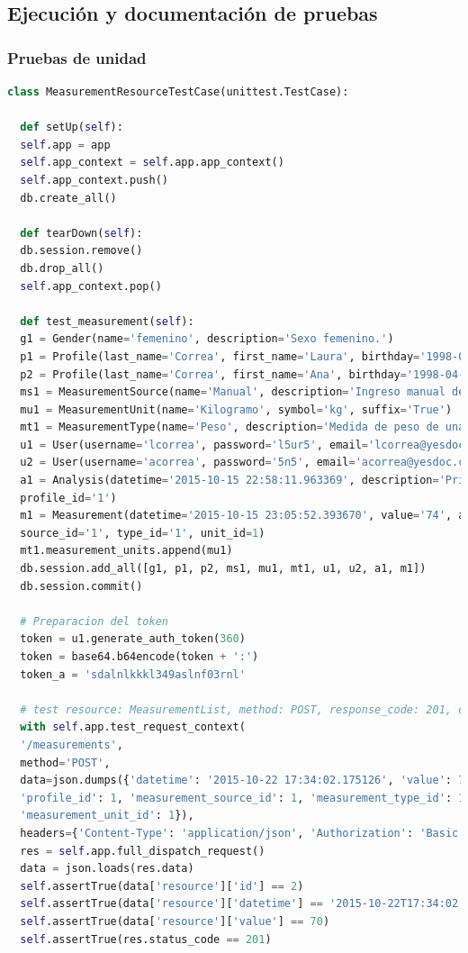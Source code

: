  \subsection{Ejecución y documentación de pruebas}
  
  \subsubsection{Pruebas de unidad}
  
  \begin{lstlisting}[language=Python ]
  class MeasurementResourceTestCase(unittest.TestCase):
  
  def setUp(self):
  self.app = app
  self.app_context = self.app.app_context()
  self.app_context.push()
  db.create_all()
  
  def tearDown(self):
  db.session.remove()
  db.drop_all()
  self.app_context.pop()
  
  def test_measurement(self):
  g1 = Gender(name='femenino', description='Sexo femenino.')
  p1 = Profile(last_name='Correa', first_name='Laura', birthday='1998-08-20', gender_id='1')
  p2 = Profile(last_name='Correa', first_name='Ana', birthday='1998-04-10', gender_id='1')
  ms1 = MeasurementSource(name='Manual', description='Ingreso manual de la medida.')
  mu1 = MeasurementUnit(name='Kilogramo', symbol='kg', suffix='True')
  mt1 = MeasurementType(name='Peso', description='Medida de peso de una persona')
  u1 = User(username='lcorrea', password='l5ur5', email='lcorrea@yesdoc.com', profile_id='1')
  u2 = User(username='acorrea', password='5n5', email='acorrea@yesdoc.com', profile_id='2')
  a1 = Analysis(datetime='2015-10-15 22:58:11.963369', description='Primer toma de medidas de peso',
  profile_id='1')
  m1 = Measurement(datetime='2015-10-15 23:05:52.393670', value='74', analysis_id='1', profile_id='1',
  source_id='1', type_id='1', unit_id=1)
  mt1.measurement_units.append(mu1)
  db.session.add_all([g1, p1, p2, ms1, mu1, mt1, u1, u2, a1, m1])
  db.session.commit()
  
  # Preparacion del token
  token = u1.generate_auth_token(360)
  token = base64.b64encode(token + ':')
  token_a = 'sdalnlkkkl349aslnf03rnl'
  
  # test resource: MeasurementList, method: POST, response_code: 201, con autorizacion
  with self.app.test_request_context(
  '/measurements',
  method='POST',
  data=json.dumps({'datetime': '2015-10-22 17:34:02.175126', 'value': 70, 'analysis_id': 1,
  'profile_id': 1, 'measurement_source_id': 1, 'measurement_type_id': 1,
  'measurement_unit_id': 1}),
  headers={'Content-Type': 'application/json', 'Authorization': 'Basic ' + token}):
  res = self.app.full_dispatch_request()
  data = json.loads(res.data)
  self.assertTrue(data['resource']['id'] == 2)
  self.assertTrue(data['resource']['datetime'] == '2015-10-22T17:34:02.175126')
  self.assertTrue(data['resource']['value'] == 70)
  self.assertTrue(res.status_code == 201)
  

\end{lstlisting}
